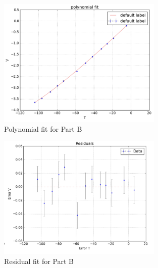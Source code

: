 \documentclass[12pt,a4paper]{report}
\begin{document}
\begin{figure}[H]
    \centering
    \includegraphics[width=0.7\textwidth]{Part B results/polynomial-fit.png}
    \caption{Polynomial fit for Part B}
    \label{fig:appendix_partB_polynomial_fit}
\end{figure}

\begin{figure}[H]
    \centering
    \includegraphics[width=0.7\textwidth]{Part B results/polynomial residual.png}
    \caption{Residual fit for Part B}
    \label{fig:appendix_partB_residual_fit}
\end{figure}
\end{document}
